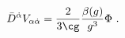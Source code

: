 \begin{equation}
  \label{eq:anomcurrent}
  \bar{D}^{\dot{\alpha}} V_{\alpha \dot{\alpha}} = \frac{2}{3 \cg}
  \frac{\beta(g)}{g^3} \Phi \ .
\end{equation}

